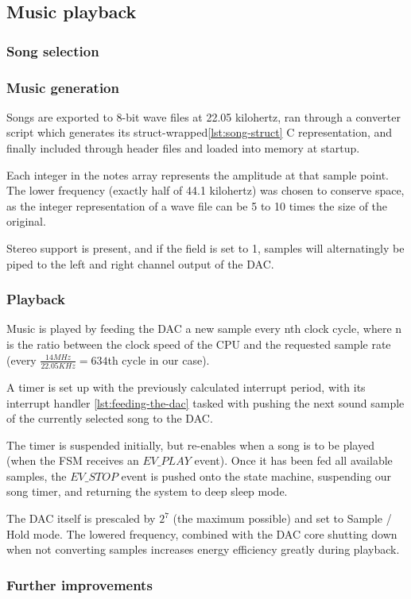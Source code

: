 \subsection{Music playback}

\subsubsection{Song selection}

\subsubsection{Music generation}

Songs are exported to 8-bit wave files at 22.05 kilohertz,
ran through a converter script which generates its struct-wrapped\ref{lst:song-struct} C
representation, and finally included through header files and loaded into memory at startup.



Each integer in the notes array represents the amplitude at that sample point.
The lower frequency (exactly half of 44.1 kilohertz) was chosen to conserve space, as the integer representation of a wave file can be 5 to 10 times the size of the original.

Stereo support is present, and if the field is set to 1, samples will alternatingly be piped to the left and right channel output of the DAC.

\subsubsection{Playback}

Music is played by feeding the DAC a new sample every nth clock cycle, where n is the ratio between the clock speed of the CPU and the requested sample rate (every $ \frac{14 MHz}{22.05 KHz} = 634 $th cycle in our case).

A timer is set up with the previously calculated interrupt period, with its interrupt handler \ref{lst:feeding-the-dac} tasked with pushing the next sound sample of the currently selected song to the DAC.

The timer is suspended initially, but re-enables when a song is to be played (when the FSM receives an $ EV\_PLAY $ event).
Once it has been fed all available samples, the $ EV\_STOP $ event is pushed onto the state machine, suspending our song timer, and returning the system to deep sleep mode.



The DAC itself is prescaled by $ 2^{7} $ (the maximum possible) and set to Sample / Hold mode.
The lowered frequency, combined with the DAC core shutting down when not converting samples increases energy efficiency greatly during playback\cite{referencemanual}.

\subsubsection{Further improvements}

